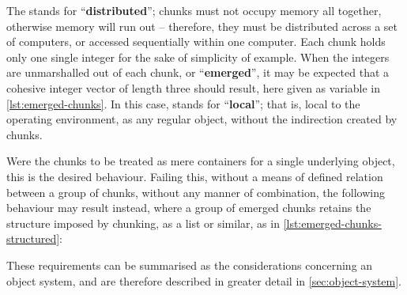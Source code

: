 
The  stands for ``\textbf{distributed}''; chunks must not occupy memory all together, otherwise memory will run out -- therefore, they must be distributed across a set of computers, or accessed sequentially within one computer.
Each chunk holds only one single integer for the sake of simplicity of example.
When the integers are unmarshalled out of each chunk, or ``\textbf{emerged}'', it may be expected that a cohesive integer vector of length three should result, here given as variable  in \cref{lst:emerged-chunks}.
In this case,  stands for ``\textbf{local}''; that is, local to the operating environment, as any regular object, without the indirection created by chunks.


Were the chunks to be treated as mere containers for a single underlying object, this is the desired behaviour.
Failing this, without a means of defined relation between a group of chunks, without any manner of combination, the following behaviour may result instead, where a group of emerged chunks retains the structure imposed by chunking, as a list or similar, as in \cref{lst:emerged-chunks-structured}:


These requirements can be summarised as the considerations concerning an object system, and are therefore described in greater detail in \cref{sec:object-system}.

